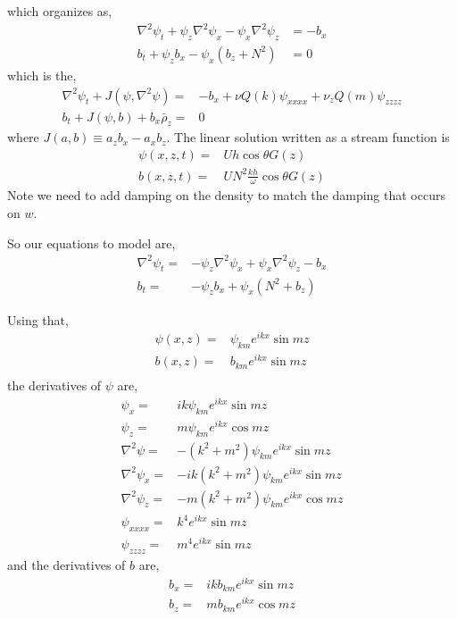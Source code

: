 \documentclass[11pt]{article}
\begin{document}
which organizes as,
\begin{subequations}{}
\begin{align} \nonumber
\nabla^2 \psi_t+ \psi_z \nabla^2 \psi_{x} -\psi_x \nabla^2 \psi_{z}  &= - b_x \\
b_t + \psi_z b_x - \psi_x ( b_z + N^2 ) &= 0
\end{align}
\end{subequations}
which is the,
\begin{subequations}{}
\begin{align}
\label{streamfunction_equation}
\nabla^2 \psi_t +  J\left( \psi, \nabla^2 \psi \right) =& -b_x + \nu Q(k) \psi_{xxxx} + \nu_z Q(m) \psi_{zzzz} \\ \label{rho_equation}
b_t + J\left( \psi, b \right) + b_x \bar{\rho}_z =& 0
\end{align}
\end{subequations}
where $J(a,b) \equiv a_z b_x - a_x b_z$. The linear solution written as a stream function is
\begin{align}
\label{linear_streamfunction}
\psi(x,z,t) =& U h \cos \theta G(z) \\
b(x,z,t) =& U N^2 \frac{kh}{\omega} \cos \theta G(z)
\end{align}
Note we need to add damping on the density to match the damping that occurs on $w$.

So our equations to model are,
\begin{subequations}{}
\begin{align}
\nabla^2 \psi_t =& -  \psi_z \nabla^2 \psi_x +  \psi_x \nabla^2 \psi_z  -b_x \\ 
b_t =& -\psi_z b_x + \psi_x (N^2 + b_z) 
\end{align}
\end{subequations}

Using that,
\begin{align}
\psi(x,z) =& \psi_{km} e^{ikx} \sin mz \\
b(x,z) =& b_{km} e^{ikx} \sin mz \\
\end{align}
the derivatives of $\psi$ are,
\begin{align}
\psi_x =& ik\psi_{km} e^{ikx} \sin mz \\
\psi_z =& m \psi_{km} e^{ikx} \cos mz \\
\nabla^2 \psi =& -(k^2 + m^2) \psi_{km} e^{ikx} \sin mz \\
\nabla^2 \psi_x =& -i k (k^2 + m^2) \psi_{km} e^{ikx} \sin mz \\
\nabla^2 \psi_z =& -m (k^2 + m^2) \psi_{km} e^{ikx} \cos mz  \\
\psi_{xxxx} = & k^4 e^{ikx} \sin mz \\
\psi_{zzzz} = & m^4 e^{ikx} \sin mz
\end{align}
and the derivatives of $b$ are,
\begin{align}
b_x =& ik b_{km} e^{ikx} \sin mz \\
b_z =& m b_{km} e^{ikx} \cos mz
\end{align}
\end{document}
